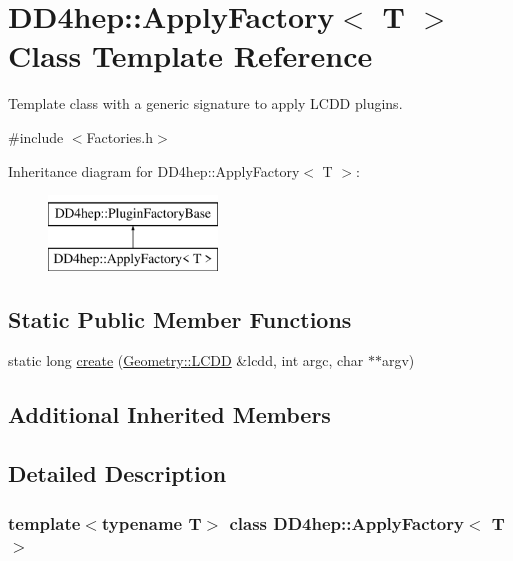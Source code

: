 \hypertarget{class_d_d4hep_1_1_apply_factory}{}\section{D\+D4hep\+:\+:Apply\+Factory$<$ T $>$ Class Template Reference}
\label{class_d_d4hep_1_1_apply_factory}


Template class with a generic signature to apply L\+C\+DD plugins.  




{\ttfamily \#include $<$Factories.\+h$>$}

Inheritance diagram for D\+D4hep\+:\+:Apply\+Factory$<$ T $>$\+:\begin{figure}[H]
\begin{center}
\leavevmode
\includegraphics[height=2.000000cm]{class_d_d4hep_1_1_apply_factory}
\end{center}
\end{figure}
\subsection*{Static Public Member Functions}
\begin{DoxyCompactItemize}
\item 
static long \hyperlink{class_d_d4hep_1_1_apply_factory_abf2c5831e9f7ddafeb30d13373e0ce82}{create} (\hyperlink{class_d_d4hep_1_1_geometry_1_1_l_c_d_d}{Geometry\+::\+L\+C\+DD} \&lcdd, int argc, char $\ast$$\ast$argv)
\end{DoxyCompactItemize}
\subsection*{Additional Inherited Members}


\subsection{Detailed Description}
\subsubsection*{template$<$typename T$>$\newline
class D\+D4hep\+::\+Apply\+Factory$<$ T $>$}


